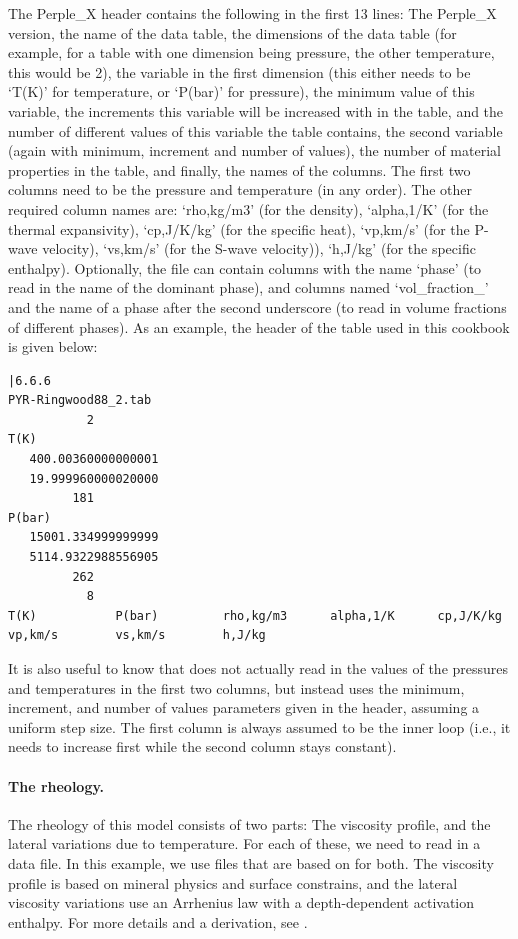 The Perple\_X header contains the following in the first 13 lines: 
The Perple\_X version, the name of the data table, the dimensions of the data table (for example, for a table with one dimension being pressure, the other temperature, this would be 2), the variable in the first dimension (this either needs to be `T(K)' for temperature, or `P(bar)' for pressure), the minimum value of this variable, the increments this variable will be increased with in the table, and the number of different values of this variable the table contains, the second variable (again with minimum, increment and number of values), the number of material properties in the table, and finally, the names of the columns. The first two columns need to be the pressure and temperature (in any order). The other required column names are:
`rho,kg/m3' (for the density), `alpha,1/K' (for the thermal expansivity), `cp,J/K/kg' (for the specific heat), `vp,km/s' (for the P-wave velocity), `vs,km/s' (for the S-wave velocity)), `h,J/kg' (for the specific enthalpy). 
Optionally, the file can contain columns with the name `phase' (to read in the name of the dominant phase), and columns named `vol\_fraction\_' and the name of a phase after the second underscore (to read in volume fractions of different phases). 
As an example, the header of the table used in this cookbook is given below:

\begin{lstlisting}
|6.6.6
PYR-Ringwood88_2.tab                                                                                
           2
T(K)    
   400.00360000000001     
   19.999960000020000     
         181
P(bar)  
   15001.334999999999     
   5114.9322988556905     
         262
           8
T(K)           P(bar)         rho,kg/m3      alpha,1/K      cp,J/K/kg      vp,km/s        vs,km/s        h,J/kg 
\end{lstlisting}

It is also useful to know that \aspect{} does not actually read in the values of the pressures and temperatures in the first two columns, but instead uses the minimum, increment, and number of values parameters given in the header, assuming a uniform step size. The first column is always assumed to be the inner loop (i.e., it needs to increase first while the second column stays constant). 




\paragraph{The rheology.}
The rheology of this model consists of two parts: The viscosity profile, and the lateral variations due to temperature. For each of these, we need to read in a data file. In this example, we use files that are based on \cite{stca06} for both. The viscosity profile is based on mineral physics and surface constrains, and the lateral viscosity variations use an Arrhenius law with a depth-dependent activation enthalpy. For more details and a derivation, see \cite{stca06}. 

